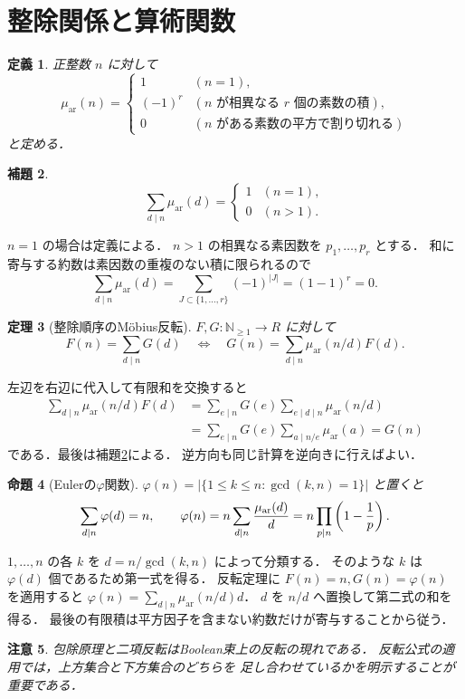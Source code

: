 \documentclass[a5paper,10pt,onecolumn]{jsarticle}
\makeatletter
\theoremstyle{mathnotetheorem}
\newtheorem{theorem}{定理}[section]
\newtheorem{definition}[theorem]{定義}
\newtheorem{lemma}[theorem]{補題}
\newtheorem{proposition}[theorem]{命題}
\newtheorem{remark}[theorem]{注意}
\renewcommand{\proofname}{証明}
\renewenvironment{proof}[1][\proofname]{%
  \par\pushQED{\qed}\normalfont\topsep4\p@\@plus2\p@\relax
  \trivlist\item[\hskip\labelsep\bfseries #1]\ignorespaces
}{\popQED\endtrivlist\@endpefalse}
\makeatother
\begin{document}
\section{整除関係と算術関数}
\begin{definition}
正整数 $n$ に対して
\[
 \mu_{\mathrm{ar}}(n)=
 \begin{cases}
 1&(n=1),\\
 (-1)^r&(n\text{ が相異なる }r\text{ 個の素数の積}),\\
 0&(n\text{ がある素数の平方で割り切れる})
 \end{cases}
\]
と定める．
\end{definition}
\begin{lemma}\label{lem:arithmu}
\[
 \sum_{d\mid n}\mu_{\mathrm{ar}}(d)
 =\begin{cases}1&(n=1),\\0&(n>1).\end{cases}
\]
\end{lemma}
\begin{proof}
$n=1$ の場合は定義による．
$n>1$ の相異なる素因数を $p_1,\dots,p_r$ とする．
和に寄与する約数は素因数の重複のない積に限られるので
\[
 \sum_{d\mid n}\mu_{\mathrm{ar}}(d)
 =\sum_{J\subset\{1,\dots,r\}}(-1)^{|J|}
 =(1-1)^r=0.
\]
\end{proof}
\begin{theorem}[整除順序のM\"obius反転]\label{thm:arithinv}
$F,G:\mathbb N_{\ge1}\to R$ に対して
\[
 F(n)=\sum_{d\mid n}G(d)
\quad\Longleftrightarrow\quad
 G(n)=\sum_{d\mid n}\mu_{\mathrm{ar}}(n/d)F(d).
\]
\end{theorem}
\begin{proof}
左辺を右辺に代入して有限和を交換すると
\[
 \begin{aligned}
 \sum_{d\mid n}\mu_{\mathrm{ar}}(n/d)F(d)
 &=\sum_{e\mid n}G(e)
   \sum_{e\mid d\mid n}\mu_{\mathrm{ar}}(n/d)\\
 &=\sum_{e\mid n}G(e)\sum_{a\mid n/e}\mu_{\mathrm{ar}}(a)
 =G(n)
 \end{aligned}
\]
である．最後は補題\ref{lem:arithmu}による．
逆方向も同じ計算を逆向きに行えばよい．
\end{proof}
\begin{proposition}[Eulerの$\varphi$関数]
$\varphi(n)=|\{1\le k\le n:\gcd(k,n)=1\}|$ と置くと
\[
 \sum_{d\mid n}\varphi(d)=n,\qquad
 \varphi(n)=n\sum_{d\mid n}{\mu_{\mathrm{ar}}(d)\over d}
 =n\prod_{p\mid n}\left(1-{1\over p}\right).
\]
\end{proposition}
\begin{proof}
$1,\dots,n$ の各 $k$ を
$d=n/\gcd(k,n)$ によって分類する．
そのような $k$ は $\varphi(d)$ 個であるため第一式を得る．
反転定理に $F(n)=n,G(n)=\varphi(n)$ を適用すると
$\varphi(n)=\sum_{d\mid n}\mu_{\mathrm{ar}}(n/d)d$．
$d$ を $n/d$ へ置換して第二式の和を得る．
最後の有限積は平方因子を含まない約数だけが寄与することから従う．
\end{proof}
\begin{remark}
包除原理と二項反転はBoolean束上の反転の現れである．
反転公式の適用では，上方集合と下方集合のどちらを
足し合わせているかを明示することが重要である．
\end{remark}
\end{document}
